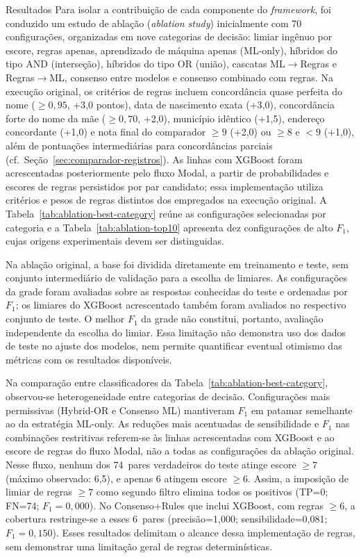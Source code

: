 \begin{chapter}{Resultados}
Para isolar a contribuição de cada componente do \textit{framework}, foi conduzido um estudo de ablação (\textit{ablation study}) inicialmente com 70 configurações, organizadas em nove categorias de decisão: limiar ingênuo por escore, regras apenas, aprendizado de máquina apenas (ML-only), híbridos do tipo AND (interseção), híbridos do tipo OR (união), cascatas ML$\rightarrow$Regras e Regras$\rightarrow$ML, consenso entre modelos e consenso combinado com regras. Na execução original, os critérios de regras incluem concordância quase perfeita do nome ($\geq 0{,}95$, +3{,}0 pontos), data de nascimento exata (+3{,}0), concordância forte do nome da mãe ($\geq 0{,}70$, +2{,}0), município idêntico (+1{,}5), endereço concordante (+1{,}0) e nota final do comparador $\geq 9$ (+2{,}0) ou $\geq 8$ e $< 9$ (+1{,}0), além de pontuações intermediárias para concordâncias parciais (cf.\ Seção~\ref{sec:comparador-registros}). As linhas com XGBoost foram acrescentadas posteriormente pelo fluxo Modal, a partir de probabilidades e escores de regras persistidos por par candidato; essa implementação utiliza critérios e pesos de regras distintos dos empregados na execução original. A Tabela~\ref{tab:ablation-best-category} reúne as configurações selecionadas por categoria e a Tabela~\ref{tab:ablation-top10} apresenta dez configurações de alto $F_1$, cujas origens experimentais devem ser distinguidas.

Na ablação original, a base foi dividida diretamente em treinamento e teste, sem conjunto intermediário de validação para a escolha de limiares. As configurações da grade foram avaliadas sobre as respostas conhecidas do teste e ordenadas por $F_1$; os limiares do XGBoost acrescentado também foram avaliados no respectivo conjunto de teste. O melhor $F_1$ da grade não constitui, portanto, avaliação independente da escolha do limiar. Essa limitação não demonstra uso dos dados de teste no ajuste dos modelos, nem permite quantificar eventual otimismo das métricas com os resultados disponíveis.





Na comparação entre classificadores da Tabela~\ref{tab:ablation-best-category}, observou-se heterogeneidade entre categorias de decisão. Configurações mais permissivas (Hybrid-OR e Consenso ML) mantiveram $F_1$ em patamar semelhante ao da estratégia ML-only. As reduções mais acentuadas de sensibilidade e $F_1$ nas combinações restritivas referem-se às linhas acrescentadas com XGBoost e ao escore de regras do fluxo Modal, não a todas as configurações da ablação original. Nesse fluxo, nenhum dos 74~pares verdadeiros do teste atinge escore $\geq 7$ (máximo observado: 6{,}5), e apenas 6 atingem escore $\geq 6$. Assim, a imposição de limiar de regras $\geq 7$ como segundo filtro elimina todos os positivos (TP=0; FN=74; $F_1=0{,}000$). No Consenso+Rules que inclui XGBoost, com regras $\geq 6$, a cobertura restringe-se a esses 6~pares (precisão=1{,}000; sensibilidade=0{,}081; $F_1=0{,}150$). Esses resultados delimitam o alcance dessa implementação de regras, sem demonstrar uma limitação geral de regras determinísticas.


\end{chapter}
